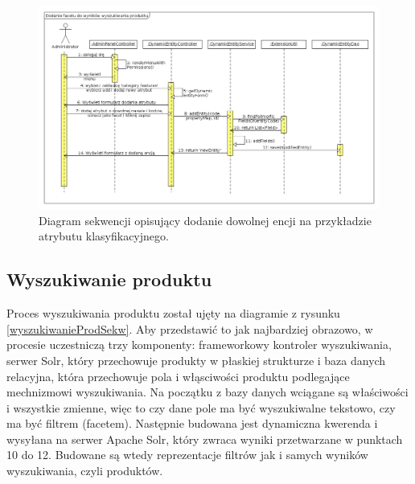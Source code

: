   \begin{figure}
 	\begin{center}
 		\includegraphics[scale=0.4]{dodanieFacetu.png}
 	\end{center}
 	\caption{{\color{black}Diagram sekwencji opisujący dodanie dowolnej encji na przykładzie atrybutu klasyfikacyjnego.}} \label{dodanieFacetu}
 \end{figure}

\subsection{Wyszukiwanie produktu}
Proces wyszukiwania produktu został ujęty na diagramie z rysunku \ref{wyszukiwanieProdSekw}. Aby przedstawić to jak najbardziej obrazowo, w procesie uczestniczą trzy komponenty: frameworkowy kontroler wyszukiwania, serwer Solr, który przechowuje produkty w płaskiej strukturze i baza danych relacyjna, która przechowuje pola i włąsciwości produktu podlegające mechnizmowi wyszukiwania. Na początku z bazy danych wciągane są właściwości i wszystkie zmienne, więc to czy dane pole ma być wyszukiwalne tekstowo, czy ma być filtrem (facetem). Następnie budowana jest dynamiczna kwerenda i wysyłana na serwer Apache Solr, który zwraca wyniki przetwarzane w punktach 10 do 12. Budowane są wtedy reprezentacje filtrów jak i samych wyników wyszukiwania, czyli produktów. 

